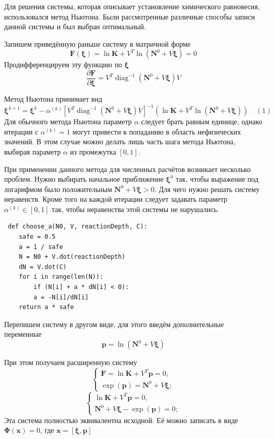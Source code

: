 \documentclass[14pt,a4paper]{extarticle}
\newcommand{\diag}{\operatorname{diag}}
\renewcommand{\vec}[1]{\boldsymbol{\mathbf{#1}}}
\begin{document}
Для решения системы, которая описывает установление химического равновесия, использовался метод Ньютона. Были рассмотренные различные способы записи данной системы и был выбран оптимальный.

Запишем приведённую раньше систему в матричной форме$$\vec{F}(\vec \xi) = \ln{\vec{K}} + V^T \ln{(\vec{N}^0 + V\vec \xi)} = 0$$
Продифференцируем эту функцию по $\vec \xi$
$$\frac{\partial \vec{F}}{\partial{\vec{\xi}}} = V^T\diag^{-1}(\vec{N}^0 + V\vec{\xi})V$$

Метод Ньютона принимает вид
$$\vec{\xi}^{k+1} = \vec{\xi}^{k} - \alpha^{(k)}[V^T\diag^{-1}(\vec{N}^0 + V\vec{\xi})V]^{-1}(\ln{\vec{K}} + V^T \ln{(\vec{N}^0 + V\vec{\xi})}) \quad (1)$$
Для обычного метода Ньютона параметр $\alpha$ следует брать равным единице, однако итерации с $\alpha^{(k)} = 1$ могут привести к попаданию в область нефизических значений. В этом случае можно делать лишь часть шага метода Ньютона, выбирая параметр $\alpha$ из промежутка $[0, 1]$.   

При применении данного метода для численных расчётов возникает несколько проблем. Нужно выбирать начальное приближение $\vec{\xi}^0$ так, чтобы выражение под логарифмом было положительным $\vec{N}^0 + V\vec{\xi} > 0$. Для чего нужно решать систему неравенств. Кроме того на каждой итерации следует задавать параметр $\alpha^{(k)} \in [0,1]$ так, чтобы неравенства этой системы не нарушались.  

\begin{verbatim}
 def choose_a(N0, V, reactionDepth, C):
    safe = 0.5
    a = 1 / safe
    N = N0 + V.dot(reactionDepth)
    dN = V.dot(C)
    for i in range(len(N)):
    	if (N[i] + a * dN[i] < 0):
    	a = -N[i]/dN[i]
    return a * safe
\end{verbatim}

Перепишем систему в другом виде, для этого введём дополнительные переменные $$\vec{p} = \ln{(\vec{N}^0 + V\vec{\xi})}$$ 

При этом получаем расширенную систему
$$\begin{cases} 
	\vec{F} = \ln{\vec{K}} + V^T\vec{p}=0,\\
	\exp(\vec{p})=\vec{N}^0 + V\vec{\xi};
	
\end{cases}$$
$$\begin{cases} 
	\ln{\vec{K}} + V^T\vec{p}=0,\\
	\vec{N}^0 + V\vec{\xi} - \exp(\vec{p}) = 0;
\end{cases}$$
Эта система полностью эквивалентна исходной. Её можно записать в виде
$\vec{\Phi}(\vec{x}) = 0$, где $ \vec{x} = [\vec{\xi}, \vec{p}]$
\end{document}
